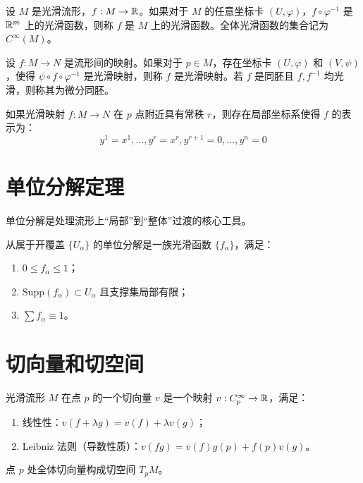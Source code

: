 \begin{definition}[光滑函数]
    设 $M$ 是光滑流形，$f: M \to \mathbb{R}$。如果对于 $M$ 的任意坐标卡 $(U, \varphi)$，$f \circ \varphi^{-1}$ 是 $\mathbb{R}^m$ 上的光滑函数，则称 $f$ 是 $M$ 上的光滑函数。全体光滑函数的集合记为 $C^\infty(M)$。
\end{definition}

\begin{definition}[光滑映射]
    设 $f: M \to N$ 是流形间的映射。如果对于 $p \in M$，存在坐标卡 $(U, \varphi)$ 和 $(V, \psi)$，使得 $\psi \circ f \circ \varphi^{-1}$ 是光滑映射，则称 $f$ 是光滑映射。若 $f$ 是同胚且 $f, f^{-1}$ 均光滑，则称其为微分同胚。
\end{definition}

\begin{theorem}[映射秩定理]
    如果光滑映射 $f: M \to N$ 在 $p$ 点附近具有常秩 $r$，则存在局部坐标系使得 $f$ 的表示为：
    \[ y^1 = x^1, \dots, y^r = x^r, y^{r+1} = 0, \dots, y^n = 0 \]
\end{theorem}

\section{单位分解定理}

单位分解是处理流形上“局部”到“整体”过渡的核心工具。
\begin{definition}[单位分解]
    从属于开覆盖 $\{U_\alpha\}$ 的单位分解是一族光滑函数 $\{f_\alpha\}$，满足：
    \begin{enumerate}[(1)]
        \item $0 \le f_\alpha \le 1$；
        \item $\mathrm{Supp}(f_\alpha) \subset U_\alpha$ 且支撑集局部有限；
        \item $\sum f_\alpha \equiv 1$。
    \end{enumerate}
\end{definition}

\section{切向量和切空间}

\begin{definition}[切向量]
    光滑流形 $M$ 在点 $p$ 的一个切向量 $v$ 是一个映射 $v: C_p^\infty \to \mathbb{R}$，满足：
    \begin{enumerate}[(1)]
        \item 线性性：$v(f + \lambda g) = v(f) + \lambda v(g)$；
        \item Leibniz 法则（导数性质）：$v(fg) = v(f)g(p) + f(p)v(g)$。
    \end{enumerate}
    点 $p$ 处全体切向量构成切空间 $T_p M$。
\end{definition}

